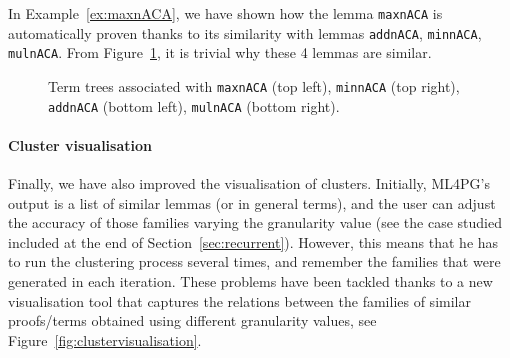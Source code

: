 \begin{example}
 In Example~\ref{ex:maxnACA}, we have shown how the lemma \lstinline?maxnACA? is automatically proven thanks to its similarity with lemmas \lstinline?addnACA?, \lstinline?minnACA?, \lstinline?mulnACA?. From Figure~\ref{fig:treevisualisation}, it is trivial why these 4 lemmas are similar.




\begin{figure}
\centering
{}
\caption{Term trees associated with \texttt{maxnACA} (top left), \texttt{minnACA} (top right), \texttt{addnACA} (bottom left), \texttt{mulnACA} (bottom right).}\label{fig:treevisualisation}
\end{figure}

 \end{example}


\paragraph{Cluster visualisation}

Finally, we have also improved the visualisation of clusters. Initially, ML4PG's output is a list of similar lemmas (or in general terms), and the user can adjust the accuracy of those families varying the granularity value (see the case studied included at the end of Section~\ref{sec:recurrent}). However, this means that he has to run the clustering process several times, and remember the families that were generated in each iteration. These problems have been tackled thanks to a new visualisation tool that captures the relations between the families of similar proofs/terms obtained using different granularity values, see Figure~\ref{fig:clustervisualisation}.





